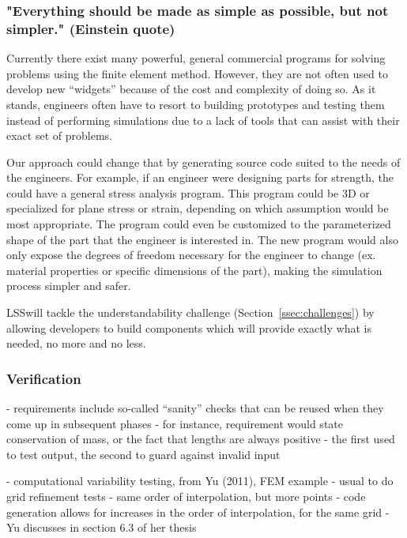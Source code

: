 \documentclass{sig-alternate-05-2015}
\newcommand{\lss}{LSS}
\begin{document}
\subsubsection{"Everything should be made as simple as possible, but not simpler."  (Einstein quote)} \label{sssec:adv_simple}

Currently there exist many powerful, general commercial programs for solving
problems using the finite element method. However, they are not often used
to develop new ``widgets'' because of the cost and complexity of doing so.
As it stands, engineers often have to resort to building prototypes and testing
them instead of performing simulations due to a lack of tools that can assist
with their exact set of problems.

Our approach could change that by generating source code suited to the needs of
the engineers. For example, if an engineer were designing parts for strength,
the could have a general stress analysis program. This program could be 3D or
specialized for plane stress or strain, depending on which assumption would be
most appropriate. The program could even be customized to the parameterized
shape of the part that the engineer is interested in. The new program would also
only expose the degrees of freedom necessary for the engineer to change (ex.
material properties or specific dimensions of the part), making the simulation
process simpler and safer.

\lss will tackle the understandability challenge (Section~\ref{ssec:challenges})
by allowing developers to build components which will provide exactly what is
needed, no more and no less.

\subsubsection{Verification} \label{sssec:adv_verify}

- requirements include so-called “sanity” checks that can be reused when they come up in subsequent phases
- for instance, requirement would state conservation of mass, or the fact that lengths are always positive - the first used to test output, the second to guard against invalid input

- computational variability testing, from Yu (2011), FEM example
- usual to do grid refinement tests - same order of interpolation, but more points
- code generation allows for increases in the order of interpolation, for the same grid
- Yu discusses in section 6.3 of her thesis
\end{document}
